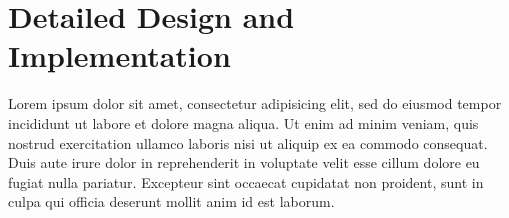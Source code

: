 \documentclass[report.tex]{subfiles}
\begin{document}
\chapter{Detailed Design and Implementation} %
\label{cha:detailed_design_and_implementation}
Lorem ipsum dolor sit amet, consectetur adipisicing elit, sed do eiusmod
tempor incididunt ut labore et dolore magna aliqua. Ut enim ad minim veniam,
quis nostrud exercitation ullamco laboris nisi ut aliquip ex ea commodo
consequat. Duis aute irure dolor in reprehenderit in voluptate velit esse
cillum dolore eu fugiat nulla pariatur. Excepteur sint occaecat cupidatat non
proident, sunt in culpa qui officia deserunt mollit anim id est laborum.

\newpage
\end{document}
